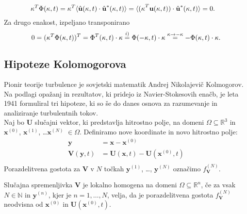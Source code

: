 \documentclass[mat2, tisk]{fmfdelo}
\newcommand{\R}{\mathbb R}
\newcommand{\N}{\mathbb N}
\newcommand{\bd}{\textbf}
\begin{document}
\begin{dokaz}
\begin{enumerate}
\begin{align*}
\end{align*}
\begin{align*}
\text{\bd{$\kappa$}}^T \Phi(\text{\bd{$\kappa$}}, t) &= \text{\bd{$\kappa$}}^T \langle \hat{\bd{u}}(\text{\bd{$\kappa$}}, t) \cdot \hat{\bd{u}}^*(\text{\bd{$\kappa$}}, t) \rangle = \langle \text{(\bd{$\kappa$}}^T \bd{u}(\text{\bd{$\kappa$}}, t)) \cdot \hat{\bd{u}}^*(\text{\bd{$\kappa$}}, t) \rangle = 0.
\end{align*}
Za drugo enakost, izpeljano transponirano
\begin{align*}
0 = (\text{\bd{$\kappa$}}^T \Phi(\text{\bd{$\kappa$}}, t))^T = \Phi^T(\text{\bd{$\kappa$}}, t) \cdot \text{\bd{$\kappa$}} \stackrel{i)}{=} \Phi(-\text{\bd{$\kappa$}}, t) \cdot \text{\bd{$\kappa$}} \stackrel{\text{\bd{$\kappa$}} \rightarrow - \text{\bd{$\kappa$}}}{=}  -\Phi(\text{\bd{$\kappa$}}, t) \cdot \text{\bd{$\kappa$}}.
\end{align*}
\end{enumerate}
\end{dokaz}

\subsection{Hipoteze Kolomogorova}
Pionir teorije turbulence je sovjetski matematik Andrej Nikolajevič Kolmogorov. 
Na podlagi opažanj in rezultatov, ki pridejo iz Navier-Stokesovih enačb, je
leta 1941 formuliral tri hipoteze, ki so še do danes osnova za 
razumevanje in analiziranje turbulentnih tokov.\\
\noindent
Naj bo $\bd{U}$ slučajni vektor, ki predstavlja hitrostno polje, 
na domeni $\Omega \subseteq \R^3$ in $\bd{x}^{(0)}$, $\bd{x}^{(1)}$, \dots $\bd{x}^{(N)}$ $\in \Omega$.
Definiramo nove koordinate in novo hitrostno polje:
\begin{align*}
\bd{y} &= \bd{x} - \bd{x}^{(0)} \\
\bd{V}(\bd{y}, t) &= \bd{U}(\bd{x}, t) - \bd{U}(\bd{x}^{(0)}, t) \\
\end{align*}
Porazdelitvena gostota za $\bd{V}$ v $N$ točkah $\bd{y}^{(1)}$, \dots, $\bd{y}^{(N)}$
označimo $f_{\bd{V}}^{(N)}$. 

\begin{definicija}
Slučajna spremenljivka $\bd{V}$ je lokalno homogena na domeni 
$\Omega \subseteq \R^n$, če za vsak $N\in \N$ in $\bd{y}^{(n)}$, 
kjer je $n = 1, \dots, N$, velja, da je porazdelitvena gostota 
$f_\bd{V}^{(N)}$ neodvisna od $\bd{x}^{(0)}$ in $\bd{U}(\bd{x}^{(0)}, t)$.
\end{definicija}
\end{document}
